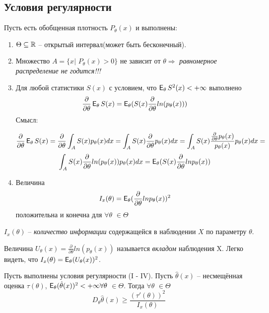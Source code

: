 \subsection{Условия регулярности}
Пусть есть обобщенная плотность $P_\theta(x)$ и выполнены:
\begin{enumerate}
    \item $\Theta \subseteq \mathbb{R}$ -- открытый интервал(может быть бесконечный).
    \item Множество $A = \{x |$ $P_\theta(x) > 0\}$ не зависит от $\theta \Rightarrow$ \emph{равномерное распределение не годится!!!}
    \item Для любой статистики $S(x)$ с условием, что $\E_\theta S^2(x) < +\infty$ выполнено 
    $$
    \frac{\partial}{\partial\theta}\E_\theta S(x) = \E_\theta(S(x)\frac{\partial}{\partial\theta}ln(p_\theta(x)))
    $$
    Смысл: 

    $$
    \frac{\partial}{\partial\theta}\E_\theta S(x) = \frac{\partial}{\partial\theta}\int_{A}S(x)p_\theta(x)dx = 
    \int_{A}S(x)\frac{\partial}{\partial\theta}p_\theta(x)dx = \int_{A}S(x)\frac{\frac{\partial}{\partial\theta}p_\theta(x)}{p_\theta(x)}p_\theta(x)dx =
    $$
    $$
    \int_{A}S(x)\frac{\partial}{\partial\theta}ln(p_\theta(x))p_\theta(x)dx = \E_\theta(S(x)\frac{\partial}{\partial\theta}lnp_\theta(x))
    $$
    \item Величина
    $$
    I_x(\theta) = \E_\theta(\frac{\partial}{\partial\theta}ln p_\theta(x))^2
    $$
    положительна и конечна для $\forall \theta$ $\in \Theta$
\end{enumerate}

\begin{definition}
$I_x(\theta)$ -- \emph{количество информации} содержащейся в наблюдении $X$ по параметру $\theta$.
\end{definition}

\begin{definition}
Величина $U_\theta(x) = \frac{\partial}{\partial\theta}ln(p_\theta(x))$ называется \emph{вкладом} наблюдения X. Легко видеть, что $I_x(\theta) = \E_\theta(U_\theta(x))^2$.
\end{definition}

\begin{theorem}
Пусть выполнены условия регулярности (I - IV). Пусть $\hat\theta(x)$ -- несмещённая оценка $\tau(\theta)$, $\E_\theta(\hat\theta(x))^2 < +\infty \forall \theta$ $\in \Theta$. Тогда $\forall \theta$ $\in \Theta$
$$
D_\theta\hat\theta(x) \geq \frac{(\tau'(\theta))^2}{I_x(\theta)}
$$
\end{theorem}

